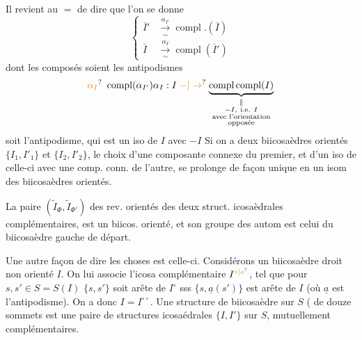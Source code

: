 Il revient au $=$ de dire que l'on se donne
\[
\left\{\begin{aligned}
\overline I'&\xrightarrow[\sim]{\alpha_{I'}}\operatorname{compl}.(\overline I)\\
\overline I&\xrightarrow[\sim]{\alpha_I}\operatorname{compl}(\overline I')
\end{aligned}\right.
\]
dont les composés soient les antipodismes
\[
\unsure{\alpha_I}\ \operatorname{compl}(\alpha_{I'})\alpha_I:
I\mathrel{\unsure{-|\to}}\underbrace{\operatorname{compl}\operatorname{compl}(I)}_{
\substack{\Vert\\-I,\ \text{i.e. }I\\\text{avec l'orientation}\\\text{opposée}}}
\]
soit l'antipodisme, qui est un
iso de $I$ avec $-I$
Si on a deux biicosaèdres orientés
$\{I_1,I'_1\}$ et $\{I_2,I'_2\}$, le choix d'une 
composante connexe du premier, et d'un
iso de celle-ci avec une comp. conn. de
l'autre, se prolonge de façon unique en
un isom des biicosaèdres orientés.

La paire  $(\widetilde I_\Phi,\widetilde I_{\Phi'})$ des rev. orientés
des deux struct. icosaèdrales  complémentaires,
est un biicos. orienté, et son groupe des
autom est celui du  biicosaèdre
gauche de départ.

Une autre façon de dire les choses est
celle-ci. Considérons un biicosaèdre droit
non orienté $I$. On lui associe l'icosa
complémentaire $I^{\unsure{\circ|o}}$, tel que pour $s,s'\in S=S(I)$
$\{s,s'\}$ soit arête de $I^\circ$ sss $\{s,\underline a(s')\}$ est arête de
$I$ (où $\underline a$ est l'antipodisme). On a donc
$I=I^{\circ\circ}$.  Une structure
de biicosaèdre sur $S$ ( de douze sommets
est une paire de structures icosaédrales
$\{I,I'\}$ sur $S$, mutuellement complémentaires.

